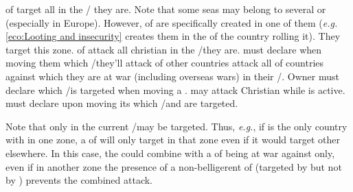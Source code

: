 \bparag \corsaire of  target all \TradeFLEET in the \STZ/\CTZ
they are.
\bparag Note that some seas may belong to several \STZ or \CTZ (especially in
Europe). However, \corsaire of  are specifically created in one
of them (\emph{e.g.} \ref{eco:Looting and insecurity} creates them in the \CTZ
of the country rolling it). They target this zone.
\bparag \corsaire of \Barbaresques attack all christian \TradeFLEET in the
\STZ/\CTZ they are. \TUR must declare when moving them which \STZ/\CTZ they'll
attack
\bparag \corsaire of other countries attack all \TradeFLEET of countries
against which they are at war (including overseas wars) in their
\STZ/\CTZ. Owner must declare which \STZ/\CTZ is targeted when moving a
\corsaire.
\bparag \TUR may attack Christian \TradeFLEET while
 is active. \TUR must declare upon moving its
\corsaire which \CTZ/\STZ and \TradeFLEET are targeted.

\begin{exemple}
  Note that only \TradeFLEET in the current \STZ/\CTZ may be targeted. Thus,
  \emph{e.g.}, if \VEN is the only country with \TradeFLEET in one zone, a
  \corsaire of \Barbaresques will only target \VEN in that zone even if it
  would target other \TradeFLEET elsewhere. In this case, the \corsaire could
  combine with a \corsaire of \TUR being at war against \VEN only, even if in
  another zone the presence of a non-belligerent \TradeFLEET of \FRA (targeted
  by \Barbaresques but not by \TUR) prevents the combined attack.
\end{exemple}

